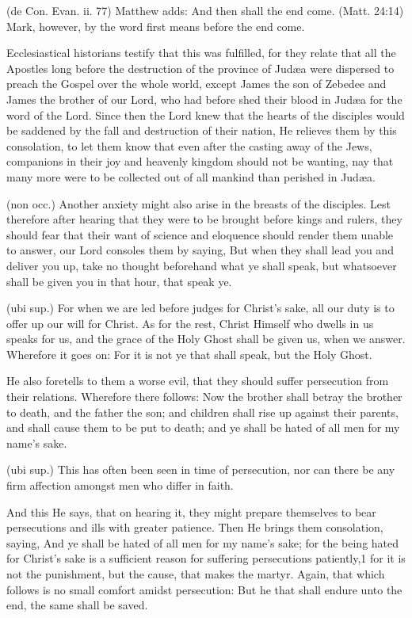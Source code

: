  (de Con. Evan. ii. 77) Matthew adds: And then shall the end come. (Matt. 24:14) Mark, however, by the word first means before the end come.

 Ecclesiastical historians testify that this was fulfilled, for they relate that all the Apostles long before the destruction of the province of Judæa were dispersed to preach the Gospel over the whole world, except James the son of Zebedee and James the brother of our Lord, who had before shed their blood in Judæa for the word of the Lord. Since then the Lord knew that the hearts of the disciples would be saddened by the fall and destruction of their nation, He relieves them by this consolation, to let them know that even after the casting away of the Jews, companions in their joy and heavenly kingdom should not be wanting, nay that many more were to be collected out of all mankind than perished in Judæa.

 (non occ.) Another anxiety might also arise in the breasts of the disciples. Lest therefore after hearing that they were to be brought before kings and rulers, they should fear that their want of science and eloquence should render them unable to answer, our Lord consoles them by saying, But when they shall lead you and deliver you up, take no thought beforehand what ye shall speak, but whatsoever shall be given you in that hour, that speak ye.

 (ubi sup.) For when we are led before judges for Christ’s sake, all our duty is to offer up our will for Christ. As for the rest, Christ Himself who dwells in us speaks for us, and the grace of the Holy Ghost shall be given us, when we answer. Wherefore it goes on: For it is not ye that shall speak, but the Holy Ghost.

 He also foretells to them a worse evil, that they should suffer persecution from their relations. Wherefore there follows: Now the brother shall betray the brother to death, and the father the son; and children shall rise up against their parents, and shall cause them to be put to death; and ye shall be hated of all men for my name’s sake.

 (ubi sup.) This has often been seen in time of persecution, nor can there be any firm affection amongst men who differ in faith.

 And this He says, that on hearing it, they might prepare themselves to bear persecutions and ills with greater patience. Then He brings them consolation, saying, And ye shall be hated of all men for my name’s sake; for the being hated for Christ’s sake is a sufficient reason for suffering persecutions patiently,1 for it is not the punishment, but the cause, that makes the martyr. Again, that which follows is no small comfort amidst persecution: But he that shall endure unto the end, the same shall be saved.

